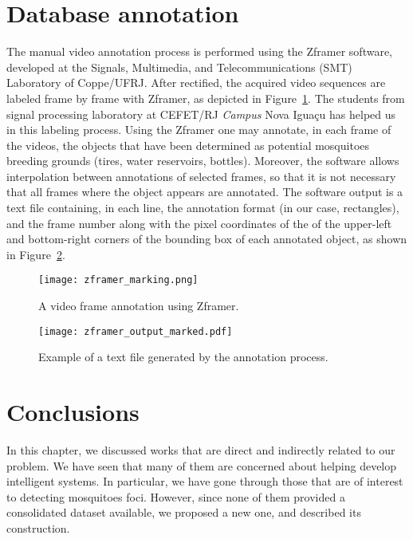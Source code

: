   \section{Database annotation}\label{sec:annot}
  The manual video annotation process is performed using the Zframer software, developed at the Signals, Multimedia, and Telecommunications (SMT)
   Laboratory of Coppe/UFRJ.
  After rectified, the acquired video sequences are labeled frame by frame with Zframer, as depicted in Figure~\ref{fig:zframer1}.
  The students from signal processing laboratory at CEFET/RJ {\it Campus} Nova Iguaçu has helped us in this labeling process.
  Using the Zframer one may annotate, in each frame of the videos, the objects that have been determined as potential mosquitoes breeding grounds (\eg tires, water reservoirs, bottles).
  Moreover, the software allows interpolation between annotations of selected frames, so that it is not necessary that all frames where the object appears are annotated.
  The software output is a text file containing, in each line, the annotation format (in our case, rectangles), and the frame number along with the pixel coordinates of the of the upper-left and bottom-right corners of the bounding box of each annotated object, as shown in Figure~\ref{fig:zframer_output}.
\begin{figure}[htb]
	\centering
	\texttt{[image: zframer\_marking.png]}%
	\caption{A video frame annotation using Zframer.}
	\label{fig:zframer1}
\end{figure}
%
\begin{figure}[htb]
	\centering
	\texttt{[image: zframer\_output\_marked.pdf]}
	\caption{Example of a text file generated by the annotation process.}
	\label{fig:zframer_output}
\end{figure}

  \section{Conclusions}
%
In this chapter, we discussed works that are direct and indirectly related to our problem.
We have seen that many of them are concerned about helping develop intelligent systems.
In particular, we have gone through those that are of interest to detecting mosquitoes foci.
However, since none of them provided a consolidated dataset available,
we proposed a new one, and described its construction.





